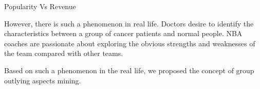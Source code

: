 \documentclass[
 size=12pt,
 paper=smartboard,  %
 mode=present, 		%
 display=slides, 	%
 style=tuliplab,  	%
 pauseslide,
 fleqn,leqno]{powerdot}
\begin{document}
\begin{slide}{Popularity Vs Revenue}
\begin{note}
However,
there is such a phenomenon in real life.
Doctors desire to identify the characteristics between
a group of cancer patients and normal people.
NBA coaches are passionate about exploring the obvious strengths and
weaknesses of the team compared with other teams.

Based on such a phenomenon in the real life,
we proposed the concept of group outlying aspects mining.
\end{note}

\end{slide}
\end{document}
